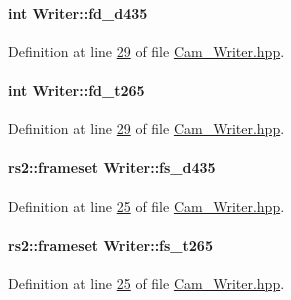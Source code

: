 \paragraph[{\texorpdfstring{fd\+\_\+d435}{fd_d435}}]{\setlength{\rightskip}{0pt plus 5cm}int Writer\+::fd\+\_\+d435}\hypertarget{classWriter_ae1327a774b081c2b229f46415148dd2a}{}\label{classWriter_ae1327a774b081c2b229f46415148dd2a}


Definition at line \hyperlink{Cam__Writer_8hpp_source_l00029}{29} of file \hyperlink{Cam__Writer_8hpp_source}{Cam\+\_\+\+Writer.\+hpp}.

\paragraph[{\texorpdfstring{fd\+\_\+t265}{fd_t265}}]{\setlength{\rightskip}{0pt plus 5cm}int Writer\+::fd\+\_\+t265}\hypertarget{classWriter_a36ab21701792358b8a1c38fb805d1330}{}\label{classWriter_a36ab21701792358b8a1c38fb805d1330}


Definition at line \hyperlink{Cam__Writer_8hpp_source_l00029}{29} of file \hyperlink{Cam__Writer_8hpp_source}{Cam\+\_\+\+Writer.\+hpp}.

\paragraph[{\texorpdfstring{fs\+\_\+d435}{fs_d435}}]{\setlength{\rightskip}{0pt plus 5cm}rs2\+::frameset Writer\+::fs\+\_\+d435}\hypertarget{classWriter_afbf490edaf8145084a3e6e0afe770d2d}{}\label{classWriter_afbf490edaf8145084a3e6e0afe770d2d}


Definition at line \hyperlink{Cam__Writer_8hpp_source_l00025}{25} of file \hyperlink{Cam__Writer_8hpp_source}{Cam\+\_\+\+Writer.\+hpp}.

\paragraph[{\texorpdfstring{fs\+\_\+t265}{fs_t265}}]{\setlength{\rightskip}{0pt plus 5cm}rs2\+::frameset Writer\+::fs\+\_\+t265}\hypertarget{classWriter_a30bbe10cfaf2e4310ac34edb3b5024cf}{}\label{classWriter_a30bbe10cfaf2e4310ac34edb3b5024cf}


Definition at line \hyperlink{Cam__Writer_8hpp_source_l00025}{25} of file \hyperlink{Cam__Writer_8hpp_source}{Cam\+\_\+\+Writer.\+hpp}.

